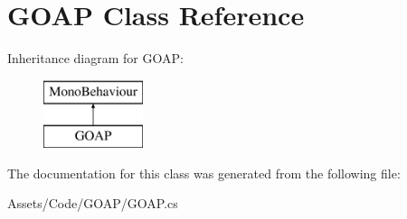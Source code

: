 \hypertarget{class_g_o_a_p}{}\section{G\+O\+A\+P Class Reference}
\label{class_g_o_a_p}
Inheritance diagram for G\+O\+A\+P\+:\begin{figure}[H]
\begin{center}
\leavevmode
\includegraphics[height=2.000000cm]{class_g_o_a_p}
\end{center}
\end{figure}


The documentation for this class was generated from the following file\+:\begin{DoxyCompactItemize}
\item 
Assets/\+Code/\+G\+O\+A\+P/G\+O\+A\+P.\+cs\end{DoxyCompactItemize}
